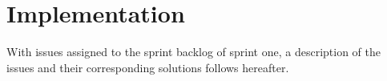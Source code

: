 \section{Implementation}
With issues assigned to the sprint backlog of sprint one, a description of the issues and their corresponding solutions follows hereafter.








